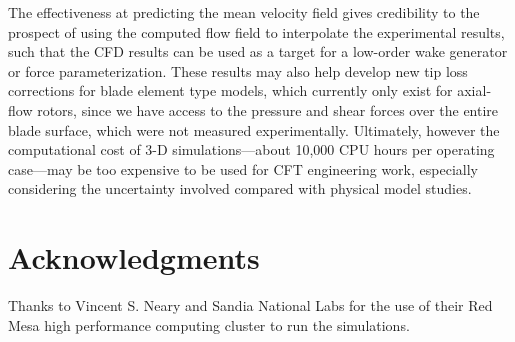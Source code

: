 The effectiveness at predicting the mean velocity field gives credibility to the
prospect of using the computed flow field to interpolate the experimental
results, such that the CFD results can be used as a target for a low-order wake
generator or force parameterization. These results may also help develop new tip
loss corrections for blade element type models, which currently only exist for
axial-flow rotors, since we have access to the pressure and shear forces over
the entire blade surface, which were not measured experimentally. Ultimately,
however the computational cost of 3-D simulations---about 10,000 CPU hours per
operating case---may be too expensive to be used for CFT engineering work,
especially considering the uncertainty involved compared with physical model
studies.


\section{Acknowledgments}

Thanks to Vincent S. Neary and Sandia National Labs for the use of their Red
Mesa high performance computing cluster to run the simulations.

